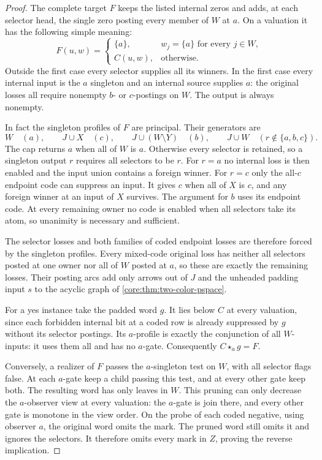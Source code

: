 \begin{proof}
The complete target $F$ keeps the listed internal zeros and adds,
at each selector head, the single zero posting every member of
$W$ at $a$. On a valuation it has the following simple meaning:
\[
 F(u,w)=
 \begin{cases}
 \{a\},& w_j=\{a\}\text{ for every }j\in W,\\
 C(u,w),&\text{otherwise}.
 \end{cases}
\]
Outside the first case every selector supplies all its winners.
In the first case every internal input is the $a$ singleton and
an internal source supplies $a$: the original losses all require
nonempty $b$- or $c$-postings on $W$. The output is always nonempty.

In fact the singleton profiles of $F$ are principal. Their generators are
\[
    W\quad(a),\qquad J\cup X\quad(c),\qquad
    J\cup(W\setminus Y)\quad(b),\qquad J\cup W\quad(r\notin\{a,b,c\}).
\]
The cap returns $a$ when all of $W$ is $a$. Otherwise every selector
is retained, so a singleton output $r$ requires all selectors to be
$r$. For $r=a$ no internal loss is then enabled and the input union
contains a foreign winner. For $r=c$ only the all-$c$ endpoint code
can suppress an input. It gives $c$ when all of $X$ is $c$, and any
foreign winner at an input of $X$ survives. The argument for $b$
uses its endpoint code. At every remaining owner no code is enabled
when all selectors take its atom, so unanimity is necessary and sufficient.

The selector losses and both families of coded endpoint losses are
therefore forced by the singleton profiles. Every mixed-code original
loss has neither all selectors posted at one owner nor all of $W$
posted at $a$, so these are exactly the remaining losses. Their
posting arcs add only arrows out of $J$ and the unheaded padding
input $s$ to the acyclic graph of \cref{core:thm:two-color-pspace}.

For a yes instance take the padded word $g$. It lies below $C$
at every valuation, since each forbidden internal bit at a coded
row is already suppressed by $g$ without its selector postings.
Its $a$-profile is exactly the conjunction of all $W$-inputs:
it uses them all and has no $a$-gate. Consequently
$C\star_a g=F$.

Conversely, a realizer of $F$ passes the $a$-singleton test on $W$,
with all selector flags false. At each $a$-gate keep a child
passing this test, and at every other gate keep both. The resulting
word has only leaves in $W$. This pruning can only decrease the
$a$-observer view at every valuation: the $a$-gate is join there,
and every other gate is monotone in the view order. On the probe
of each coded negative, using observer $a$, the original word omits
the mark. The pruned word still omits it and ignores the selectors.
It therefore omits every mark in $Z$, proving the reverse implication.


\end{proof}
